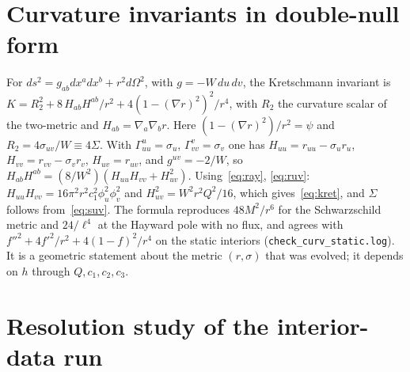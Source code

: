 \documentclass[11pt]{article}
\begin{document}
\section{Curvature invariants in double-null form}
\label{app:curv}

For $ds^{2}=g_{ab}dx^{a}dx^{b}+r^{2}d\Omega^{2}$, with $g=-W\,du\,dv$, the Kretschmann invariant is $K=R_2^{2}+8\,H_{ab}H^{ab}/r^{2}+4(1-(\nabla r)^{2})^{2}/r^{4}$, with $R_2$ the curvature scalar of the two-metric and $H_{ab}=\nabla_a\nabla_br$. Here $(1-(\nabla r)^{2})/r^{2}=\psi$ and $R_2=4\sigma_{uv}/W\equiv4\Sigma$. With $\Gamma^{u}_{uu}=\sigma_u$, $\Gamma^{v}_{vv}=\sigma_v$ one has $H_{uu}=r_{uu}-\sigma_ur_u$, $H_{vv}=r_{vv}-\sigma_vr_v$, $H_{uv}=r_{uv}$, and $g^{uv}=-2/W$, so $H_{ab}H^{ab}=(8/W^{2})(H_{uu}H_{vv}+H_{uv}^{2})$. Using~\eqref{eq:ray}, \eqref{eq:ruv}: $H_{uu}H_{vv}=16\pi^{2}r^{2}c_1^{2}\phi_u^{2}\phi_v^{2}$ and $H_{uv}^{2}=W^{2}r^{2}Q^{2}/16$, which gives~\eqref{eq:kret}, and $\Sigma$ follows from~\eqref{eq:suv}. The formula reproduces $48M^{2}/r^{6}$ for the Schwarzschild metric and $24/\ell^{4}$ at the Hayward pole with no flux, and agrees with $f''^{2}+4f'^{2}/r^{2}+4(1-f)^{2}/r^{4}$ on the static interiors (\texttt{check\_curv\_static.log}). It is a geometric statement about the metric $(r,\sigma)$ that was evolved; it depends on $h$ through $Q,c_1,c_2,c_3$.

\section{Resolution study of the interior-data run}
\label{app:res}
\end{document}

